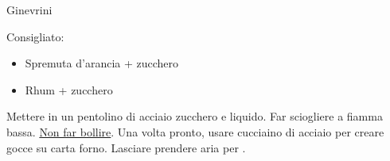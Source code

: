 \begin{recipe}{Ginevrini}
    \begin{header}
    
    \end{header}
    
    \begin{introduction}
        Consigliato:
        
        \begin{itemize}
            \item Spremuta d'arancia + zucchero
            \item Rhum + zucchero
        \end{itemize}
    \end{introduction}
    
    \begin{ingredients}
    \end{ingredients}
    
    \begin{preparation}
        \step Mettere in un pentolino di acciaio zucchero e liquido.
        \step Far sciogliere a fiamma bassa. \underline{Non far bollire}.
        \step Una volta pronto, usare cucciaino di acciaio per creare gocce su carta forno.
        \step Lasciare prendere aria per .
    \end{preparation}
\end{recipe}
